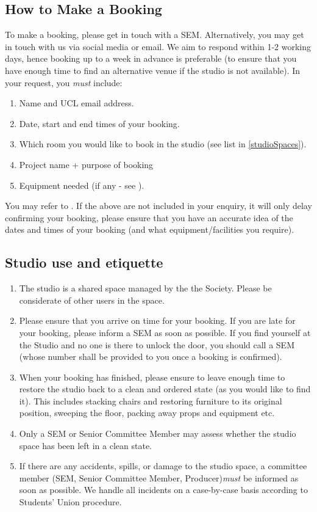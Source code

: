 \documentclass[]{article}
\begin{document}
\subsection{How to Make a Booking}
To make a booking, please get in touch with a SEM. Alternatively, you may get in touch with us via social media or email. We aim to respond within 1-2 working days, hence booking up to a week in advance is preferable (to ensure that you have enough time to find an alternative venue if the studio is not available). In your request, you \textit{must} include:
\begin{enumerate}
    \item Name and UCL email address.
    \item Date, start and end times of your booking.
    \item Which room you would like to book in the studio (see list in \ref{studioSpaces}).
    \item Project name + purpose of booking
    \item Equipment needed (if any - see ).
\end{enumerate}
You may refer to . If the above are not included in your enquiry, it will only delay confirming your booking, please ensure that you have an accurate idea of the dates and times of your booking (and what equipment/facilities you require).
\subsection{Studio use and etiquette}
\begin{enumerate}
    \item The studio is a shared space managed by the the Society. Please be considerate of other users in the space.
    \item Please ensure that you arrive on time for your booking. If you are late for your booking, please inform a SEM as soon as possible. If you find yourself at the Studio and no one is there to unlock the door, you should call a SEM (whose number shall be provided to you once a booking is confirmed).
    \item When your booking has finished, please ensure to leave enough time to restore the studio back to a clean and ordered state (as you would like to find it). This includes stacking chairs and restoring furniture to its original position, sweeping the floor, packing away props and equipment etc.
    \item Only a SEM or Senior Committee Member may assess whether the studio space has been left in a clean state.
    \item If there are any accidents, spills, or damage to the studio space, a committee member (SEM, Senior Committee Member, Producer)\textit{must} be informed as soon as possible. We handle all incidents on a case-by-case basis according to Students' Union procedure.
\end{enumerate}
\end{document}
